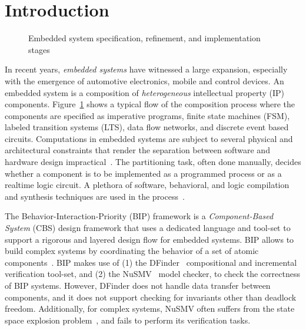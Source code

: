\section{Introduction}
\label{sect-intro}

\begin{figure}
\resizebox{.9\columnwidth}{!}{
  
}
\caption{Embedded system specification, refinement, and implementation stages}
\label{fig:flow}
\end{figure}

In recent years, {\em embedded systems} have witnessed a large 
expansion, especially with  the emergence of automotive 
electronics, mobile and control devices.
An embedded system is a composition of {\em heterogeneous}
intellectual property (IP) components.
Figure~\ref{fig:flow} shows a typical flow of the composition process where the
components are specified as imperative programs, finite state machines (FSM), labeled 
transition systems (LTS), data flow networks, and discrete event based circuits. 
Computations in embedded systems are subject to several 
physical and architectural 
constraints that render the separation between software and 
hardware design impractical~\cite{henzinger2006embedded}.
The partitioning task, often done manually, decides whether a component is to 
be implemented as a programmed process or as a realtime logic circuit. 
A plethora of software, behavioral, and logic compilation and synthesis techniques are
used in the process~\cite{metropolis2}.


The Behavior-Interaction-Priority (BIP) framework 
is a {\em Component-Based System} (CBS) design framework that uses a dedicated 
language and tool-set to support a rigorous and layered design flow for embedded 
systems.  
BIP allows to build complex systems by coordinating the behavior of a set of 
atomic components~\cite{BasuBBCJNS11}.
BIP makes use of (1) the DFinder~\cite{dfinder} compositional  
and incremental verification tool-set, and (2) the NuSMV~\cite{nusmv} model checker, 
to check the correctness of BIP systems. 
However, DFinder \cite{BBL14} does not handle data transfer between components, 
and it does not support checking for invariants other than deadlock freedom. 
Additionally, for complex systems, NuSMV often suffers from the state space explosion 
problem~\cite{sipser2006introduction}, and fails to perform its verification tasks.

